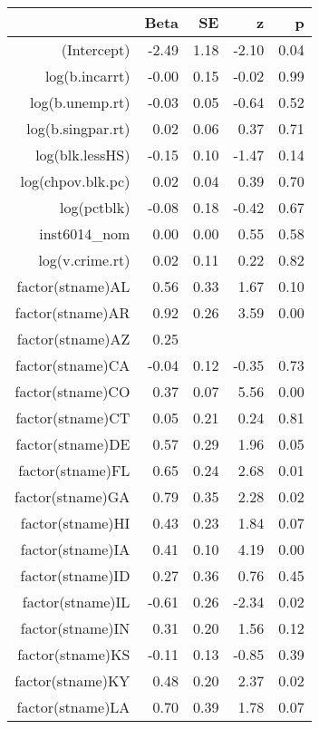 \begin{table}[ht]
\centering
\begin{tabular}{rrrrr}
  \hline
 & Beta & SE & z & p \\ 
  \hline
(Intercept) & -2.49 & 1.18 & -2.10 & 0.04 \\ 
  log(b.incarrt) & -0.00 & 0.15 & -0.02 & 0.99 \\ 
  log(b.unemp.rt) & -0.03 & 0.05 & -0.64 & 0.52 \\ 
  log(b.singpar.rt) & 0.02 & 0.06 & 0.37 & 0.71 \\ 
  log(blk.lessHS) & -0.15 & 0.10 & -1.47 & 0.14 \\ 
  log(chpov.blk.pc) & 0.02 & 0.04 & 0.39 & 0.70 \\ 
  log(pctblk) & -0.08 & 0.18 & -0.42 & 0.67 \\ 
  inst6014\_nom & 0.00 & 0.00 & 0.55 & 0.58 \\ 
  log(v.crime.rt) & 0.02 & 0.11 & 0.22 & 0.82 \\ 
  factor(stname)AL & 0.56 & 0.33 & 1.67 & 0.10 \\ 
  factor(stname)AR & 0.92 & 0.26 & 3.59 & 0.00 \\ 
  factor(stname)AZ & 0.25 &  &  &  \\ 
  factor(stname)CA & -0.04 & 0.12 & -0.35 & 0.73 \\ 
  factor(stname)CO & 0.37 & 0.07 & 5.56 & 0.00 \\ 
  factor(stname)CT & 0.05 & 0.21 & 0.24 & 0.81 \\ 
  factor(stname)DE & 0.57 & 0.29 & 1.96 & 0.05 \\ 
  factor(stname)FL & 0.65 & 0.24 & 2.68 & 0.01 \\ 
  factor(stname)GA & 0.79 & 0.35 & 2.28 & 0.02 \\ 
  factor(stname)HI & 0.43 & 0.23 & 1.84 & 0.07 \\ 
  factor(stname)IA & 0.41 & 0.10 & 4.19 & 0.00 \\ 
  factor(stname)ID & 0.27 & 0.36 & 0.76 & 0.45 \\ 
  factor(stname)IL & -0.61 & 0.26 & -2.34 & 0.02 \\ 
  factor(stname)IN & 0.31 & 0.20 & 1.56 & 0.12 \\ 
  factor(stname)KS & -0.11 & 0.13 & -0.85 & 0.39 \\ 
  factor(stname)KY & 0.48 & 0.20 & 2.37 & 0.02 \\ 
  factor(stname)LA & 0.70 & 0.39 & 1.78 & 0.07 \\ 

\end{tabular}
\end{table}
